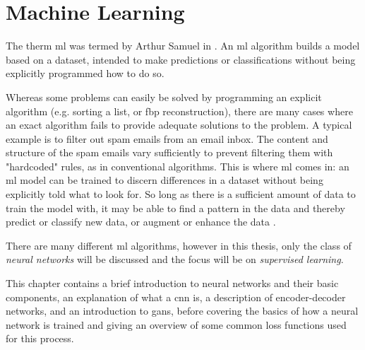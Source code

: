 \chapter{Machine Learning}
\label{sec:ml}
The therm \gls{ml} was termed by Arthur Samuel in \citeyear{samuelmachinelearning} \cite{samuelmachinelearning}. An \gls{ml} algorithm builds a model based on a dataset, intended to make predictions or classifications without being explicitly programmed how to do so. 

Whereas some problems can easily be solved by programming an explicit algorithm (e.g. sorting a list, or \gls{fbp} reconstruction), there are many cases where an exact algorithm fails to provide adequate solutions to the problem. A typical example is to filter out spam emails from an email inbox. The content and structure of the spam emails vary sufficiently to prevent filtering them with "hardcoded" rules, as in conventional algorithms. This is where \gls{ml} comes in: an \gls{ml} model can be trained to discern differences in a dataset without being explicitly told what to look for. So long as there is a sufficient amount of data to train the model with, it may be able to find a pattern in the data and thereby predict or classify new data, or augment or enhance the data \cite[2-4]{Alpaydin10}. 

There are many different \gls{ml} algorithms, however in this thesis, only the class of \textit{neural networks} will be discussed and the focus will be on \textit{supervised learning}. 

This chapter contains a brief introduction to neural networks and their basic components, an explanation of what a \gls{cnn} is, a description of encoder-decoder networks, and an introduction to \glspl{gan}, before covering the basics of how a neural network is trained and giving an overview of some common loss functions used for this process. 

